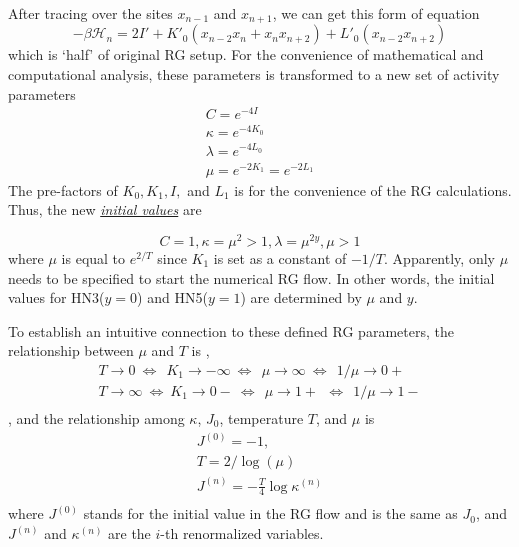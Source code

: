 After tracing over the sites $x_{n-1}$ and $x_{n+1}$, we can get this form of equation
\begin{equation}
\label{eq:hn35-z1}
 -\beta \mathcal{H}_n = 2I' +  K'_0 \left(x_{n-2}x_{n} +  x_{n}x_{n+2}\right) + L'_0(x_{n-2}x_{n+2})
 \end{equation}
 which is `half' of original RG setup.
For the convenience of mathematical and computational analysis, these parameters is transformed to a new set of activity parameters  
\begin{equation}
\begin{array}{l}
\displaystyle C = e^{-4I}   \\
\displaystyle \kappa = e^{-4K_0} \\
\displaystyle \lambda = e^{-4L_0}  \\
\displaystyle \mu = e^{-2K_1} = e^{-2L_1} 
\end{array} 
\label{eq:hn35-activities}
\end{equation}
The pre-factors of $K_0, K_1, I ,$ and $ L_1$ is for the convenience of the RG calculations. Thus, the  new \underline{\emph{initial values}}  are


\begin{equation}
C = 1,   \kappa = \mu^2 > 1, \lambda =\mu^{2y} , \mu >1 
\label{eq:hn35-init1}
\end{equation}
where $\mu$ is equal to $e^{2/T}$ since $K_1$ is set as a constant of $-1/T$. Apparently, only $\mu$ needs to be specified to start the numerical RG flow. In other words, the initial values for HN3($y=0$) and HN5($y=1$) are determined by $\mu$ and $y$.

To establish an intuitive connection to these defined RG parameters, the relationship between $\mu$ and $T$ is ,  
\begin{equation}
\begin{array}{l}
\displaystyle T\rightarrow 0 \ \Leftrightarrow \ \ K_1 \rightarrow -\infty  \ \Leftrightarrow \ \ \mu \rightarrow \infty   \ \Leftrightarrow  \ \ {1}/{\mu}\rightarrow 0+\\
\displaystyle T\rightarrow \infty  \ \Leftrightarrow  \ K_1 \rightarrow 0- \ \Leftrightarrow  \ \ \mu \rightarrow 1+ \  \ \Leftrightarrow  \ \  {1}/{\mu}\rightarrow 1- \\
\end{array} 
\label{eq:Ts}
\end{equation}
, and the relationship among $\kappa$, $J_0$, temperature $T$, and $\mu$ is
\begin{equation}
\begin{array}{l}
J^{(0)} = -1,  \\ 
T = 2/\log(\mu) \\ 
J^{(n)} = -\frac{T}{4}\log\kappa^{(n)} \\
\end{array}
\label{eq:afm-hn35-jk}
\end{equation} 
where $J^{(0)}$ stands for the initial value in the RG flow and is the same as $J_0$, and $J^{(n)}$ and $\kappa ^{(n)}$ are the $i$-th renormalized variables.

